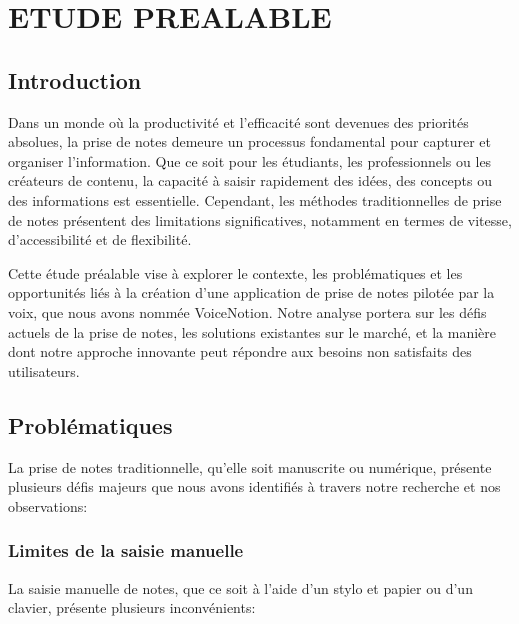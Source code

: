 
\chapter{ETUDE PREALABLE}

\section{Introduction}

Dans un monde où la productivité et l'efficacité sont devenues des priorités absolues, la prise de notes demeure un processus fondamental pour capturer et organiser l'information. Que ce soit pour les étudiants, les professionnels ou les créateurs de contenu, la capacité à saisir rapidement des idées, des concepts ou des informations est essentielle. Cependant, les méthodes traditionnelles de prise de notes présentent des limitations significatives, notamment en termes de vitesse, d'accessibilité et de flexibilité.

Cette étude préalable vise à explorer le contexte, les problématiques et les opportunités liés à la création d'une application de prise de notes pilotée par la voix, que nous avons nommée VoiceNotion. Notre analyse portera sur les défis actuels de la prise de notes, les solutions existantes sur le marché, et la manière dont notre approche innovante peut répondre aux besoins non satisfaits des utilisateurs.

\section{Problématiques}

La prise de notes traditionnelle, qu'elle soit manuscrite ou numérique, présente plusieurs défis majeurs que nous avons identifiés à travers notre recherche et nos observations:

\subsection{Limites de la saisie manuelle}

La saisie manuelle de notes, que ce soit à l'aide d'un stylo et papier ou d'un clavier, présente plusieurs inconvénients:

